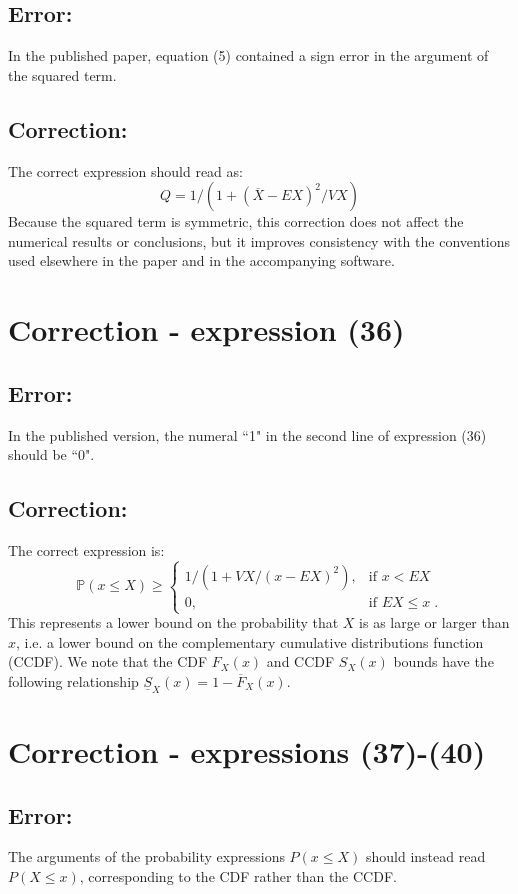 \documentclass{article}
\begin{document}
\subsection*{Error:}
In the published paper, equation (5) contained a sign error in the argument of the squared term.
\subsection*{Correction:}
The correct expression should read as:
\begin{equation*}
Q = 1/(1+ (\overline{X} - EX)^2/VX)
\end{equation*}
Because the squared term is symmetric, this correction does not affect the numerical results or conclusions, but it improves consistency with the conventions used elsewhere in the paper and in the accompanying software.

\section{Correction - expression (36)}
\subsection*{Error:}
In the published version, the numeral ``1" in the second line of expression (36) should be ``0".

\subsection*{Correction:}
The correct expression is:
\begin{equation*}
  \mathbb{P}(x \leq X)  \geq \begin{cases} 1 / (1 + VX/(x - EX)^2),& \text{if } x<EX \\
  0,& \text{if } EX\leq x\;. \end{cases}
\end{equation*}
This represents a lower bound on the probability that $X$ is as large or larger than $x$, i.e. a lower bound on the complementary cumulative distributions function (CCDF). We note that the CDF $F_X(x)$ and CCDF $S_{X}(x)$ bounds have the following relationship $\underline{S}_X(x) = 1 - \overline{F}_X(x)$.

\section{Correction - expressions (37)-(40)}
\subsection*{Error:}
The arguments of the probability expressions $P(x \leq X)$ should instead read $P(X \leq x)$, corresponding to the CDF rather than the CCDF.
\end{document}
